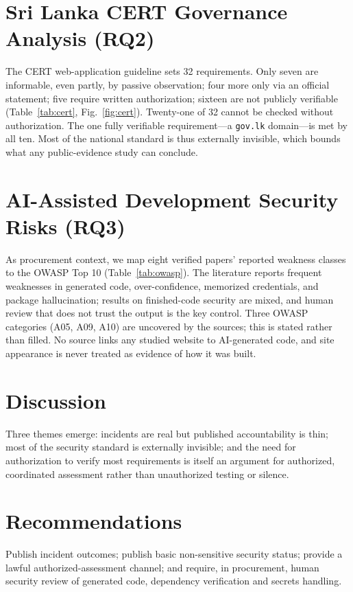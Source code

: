 \documentclass[conference]{IEEEtran}
\begin{document}
\section{Sri Lanka CERT Governance Analysis (RQ2)}
The CERT web-application guideline sets 32 requirements. Only seven are informable, even partly,
by passive observation; four more only via an official statement; five require written
authorization; sixteen are not publicly verifiable (Table~\ref{tab:cert},
Fig.~\ref{fig:cert}). Twenty-one of 32 cannot be checked without authorization. The one fully
verifiable requirement---a \texttt{gov.lk} domain---is met by all ten. Most of the national
standard is thus externally invisible, which bounds what any public-evidence study can conclude.

\section{AI-Assisted Development Security Risks (RQ3)}
As procurement context, we map eight verified papers' reported weakness classes to the OWASP Top
10 (Table~\ref{tab:owasp}). The literature reports frequent weaknesses in generated code,
over-confidence, memorized credentials, and package hallucination; results on finished-code
security are mixed, and human review that does not trust the output is the key control. Three
OWASP categories (A05, A09, A10) are uncovered by the sources; this is stated rather than filled.
No source links any studied website to AI-generated code, and site appearance is never treated
as evidence of how it was built.

\section{Discussion}
Three themes emerge: incidents are real but published accountability is thin; most of the
security standard is externally invisible; and the need for authorization to verify most
requirements is itself an argument for authorized, coordinated assessment rather than
unauthorized testing or silence.

\section{Recommendations}
Publish incident outcomes; publish basic non-sensitive security status; provide a lawful
authorized-assessment channel; and require, in procurement, human security review of generated
code, dependency verification and secrets handling.
\end{document}
